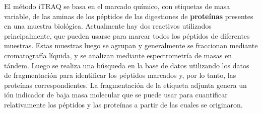 \documentclass[12pt,twoside]{reedthesis}
\begin{document}
El método iTRAQ se basa en el marcado químico, con etiquetas de masa variable, de las aminas de los péptidos de las digestiones de \textbf{proteínas} presentes en una muestra biológica. Actualmente hay dos reactivos utilizados principalmente, que pueden usarse para marcar todos los péptidos de diferentes muestras. Estas muestras luego se agrupan y generalmente se fraccionan mediante cromatografía líquida, y se analizan mediante espectrometría de masas en tándem. Luego se realiza una búsqueda en la base de datos utilizando los datos de fragmentación para identificar los péptidos marcados y, por lo tanto, las proteínas correspondientes. La fragmentación de la etiqueta adjunta genera un ión indicador de baja masa molecular que se puede usar para cuantificar relativamente los péptidos y las proteínas a partir de las cuales se originaron.

\par
\end{document}
